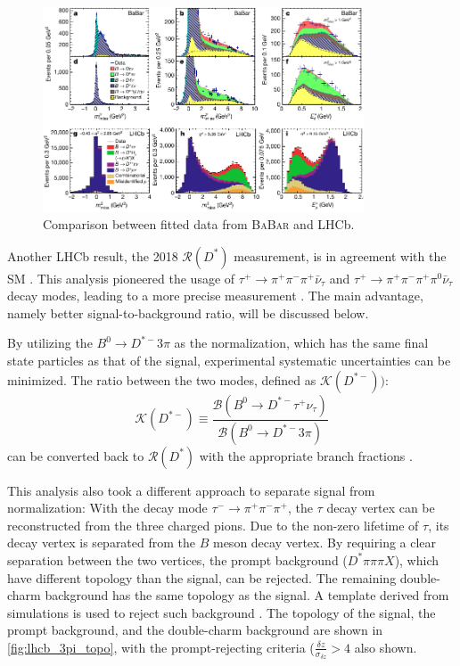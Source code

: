 \documentclass[12pt,letterpaper]{article}
\def\BaBar/{\textsc{BaBar}}
\def\RDst/{\ensuremath{\mathcal{R}(D^{*})}}
\begin{document}
\begin{figure}[ht]
    \centering
    \includegraphics[width=0.85\textwidth]{figs/babar_lhcb_fit_comparison.pdf}
    \caption{
        Comparison between fitted data from \BaBar/ and LHCb.
    }
    \label{fig:babar_lhcb_fit_comparison}
\end{figure}

Another LHCb result, the 2018 \RDst/ measurement, is in agreement with the SM \cite{Aaij:2017deq}.
This analysis pioneered the usage of
$\tau^+ \rightarrow \pi^+ \pi^- \pi^+ \bar{\nu}_\tau$
and
$\tau^+ \rightarrow \pi^+ \pi^- \pi^+ \pi^0 \bar{\nu}_\tau$
decay modes, leading to a more precise measurement \cite{Aaij:2017deq}.
The main advantage, namely better signal-to-background ratio, will be discussed below.

By utilizing the $B^0 \rightarrow D^{*-} 3\pi$ as the normalization, which has the same final state particles as that of the signal, experimental systematic uncertainties can be minimized.
The ratio between the two modes, defined as $\mathcal{K}(D^{*-}))$:
\begin{equation}
    \mathcal{K}(D^{*-}) \equiv \frac{
        \mathcal{B}(B^0 \rightarrow D^{*-} \tau^+ \nu_\tau)
    }{
        \mathcal{B}(B^0 \rightarrow D^{*-} 3 \pi)
    }
\end{equation}
can be converted back to \RDst/ with the appropriate branch fractions \cite{Aaij:2017deq}.

This analysis also took a different approach to separate signal from normalization:
With the decay mode $\tau^- \rightarrow \pi^+ \pi^- \pi^+$,
the $\tau$ decay vertex can be reconstructed from the three charged pions.
Due to the non-zero lifetime of $\tau$, its decay vertex is
separated from the $B$ meson decay vertex.
By requiring a clear separation between the two vertices, the prompt background
($D^* \pi \pi \pi X$), which have different topology than the signal, can be rejected.
The remaining double-charm background has the same topology as the signal.
A template derived from simulations is used to reject such
background \cite{Aaij:2017deq}.
The topology of the signal, the prompt background, and the double-charm background are shown in \autoref{fig:lhcb_3pi_topo}, with the prompt-rejecting criteria ($\frac{\delta z}{\sigma_{\delta z}} > 4$ also shown.
\end{document}
